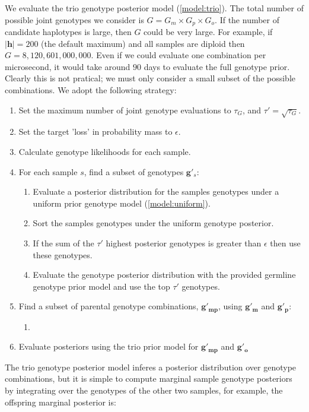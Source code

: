\documentclass{article}
\begin{document}
We evaluate the trio genotype posterior model (\ref{model:trio}). The total number of possible joint genotypes we consider is $G = G_m \times G_p \times G_o$. If the number of candidate haplotypes is large, then $G$ could be very large. For example, if $|\boldsymbol{h}| = 200$ (the default maximum) and all samples are diploid then $G = 8,120,601,000,000$. Even if we could evaluate one combination per microsecond, it would take around $90$ days to evaluate the full genotype prior. Clearly this is not pratical; we must only consider a small subset of the possible combinations. We adopt the following strategy:

\begin{enumerate}
	\item Set the maximum number of joint genotype evaluations to $\tau_G$, and $\tau' = \sqrt{\tau_G}$.
	\item Set the target 'loss' in probability mass to $\epsilon$.
	\item Calculate genotype likelihoods for each sample.
	\item For each sample $s$, find a subset of genotypes $\boldsymbol{g}'_s$: 
	\begin{enumerate}
		\item Evaluate a posterior distribution for the samples genotypes under a uniform prior genotype model (\ref{model:uniform}).
		\item Sort the samples genotypes under the uniform genotype posterior.
		\item If the sum of the $\tau'$ highest posterior genotypes is greater than $\epsilon$ then use these genotypes.
		\item Evaluate the genotype posterior distribution with the provided germline genotype prior model and use the top $\tau'$ genotypes.
	\end{enumerate}
	\item Find a subset of parental genotype combinations, $\boldsymbol{g'_{mp}}$, using $\boldsymbol{g'_{m}}$ and $\boldsymbol{g'_{p}}$:
	\begin{enumerate}
		\item 
	\end{enumerate}
	\item Evaluate posteriors using the trio prior model for $\boldsymbol{g'_{mp}}$ and $\boldsymbol{g'_o}$
\end{enumerate}

The trio genotype posterior model inferes a posterior distribution over genotype combinations, but it is simple to compute marginal sample genotype posteriors by integrating over the genotypes of the other two samples, for example, the offspring marginal posterior is:
\end{document}
